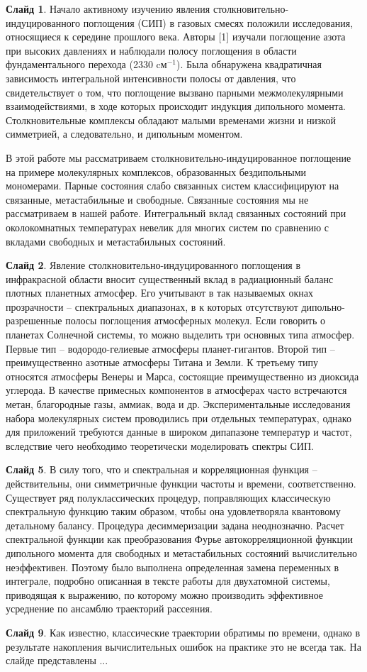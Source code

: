 \documentclass[12pt]{article}
\begin{document}
\textbf{Слайд 1}. Начало активному изучению явления столкновительно-индуцированного поглощения (СИП) в газовых смесях положили исследования, относящиеся к середине прошлого века. Авторы [1] изучали поглощение азота при высоких давлениях и наблюдали полосу поглощения в области фундаментального перехода (2330 cм$^{-1}$). Была обнаружена квадратичная зависимость интегральной интенсивности полосы от давления, что свидетельствует о том, что поглощение вызвано парными межмолекулярными взаимодействиями, в ходе которых происходит индукция дипольного момента. Столкновительные комплексы обладают малыми временами жизни и низкой симметрией, а следовательно, и дипольным моментом. \par 
В этой работе мы рассматриваем столкновительно-индуцированное поглощение на примере молекулярных комплексов, образованных бездипольными мономерами. Парные состояния слабо связанных систем классифицируют на связанные, метастабильные и свободные. Связанные состояния мы не рассматриваем в нашей работе. Интегральный вклад связанных состояний при околокомнатных температурах невелик для многих систем по сравнению с вкладами свободных и метастабильных состояний. \par 
\textbf{Слайд 2}. Явление столкновительно-индуцированного поглощения в инфракрасной области вносит существенный вклад в радиационный баланс плотных планетных атмосфер. Его учитывают в так называемых окнах прозрачности -- спектральных диапазонах, в к которых отсутствуют дипольно-разрешенные полосы поглощения атмосферных молекул. Если говорить о планетах Солнечной системы, то можно выделить три основных типа атмосфер. Первые тип -- водородо-гелиевые атмосферы планет-гигантов. Второй тип -- преимущественно азотные атмосферы Титана и Земли. К третьему типу относятся атмосферы Венеры и Марса, состоящие преимущественно из диоксида углерода. В качестве примесных компонентов в атмосферах часто встречаются метан, благородные газы, аммиак, вода и др. Экспериментальные исследования набора молекулярных систем проводились при отдельных температурах, однако для приложений требуются данные в широком дипапазоне температур и частот, вследствие чего необходимо теоретически моделировать спектры СИП. \par 
\textbf{Слайд 5}. В силу того, что и спектральная и корреляционная функция -- действительны, они симметричные функции частоты и времени, соответственно. Существует ряд полуклассических процедур, поправляющих классическую спектральную функцию таким образом, чтобы она удовлетворяла квантовому детальному балансу. Процедура десиммеризации задана неоднозначно. Расчет спектральной функции как преобразования Фурье автокорреляционной функции дипольного момента для свободных и метастабильных состояний вычислительно неэффективен. Поэтому было выполнена определенная замена переменных в интеграле, подробно описанная в тексте работы для двухатомной системы, приводящая к выражению, по которому можно производить эффективное усреднение по ансамблю траекторий рассеяния. \par
\textbf{Слайд 9}. Как известно, классические траектории обратимы по времени, однако в результате накопления вычислительных ошибок на практике это не всегда так. На слайде представлены ...
\end{document}
